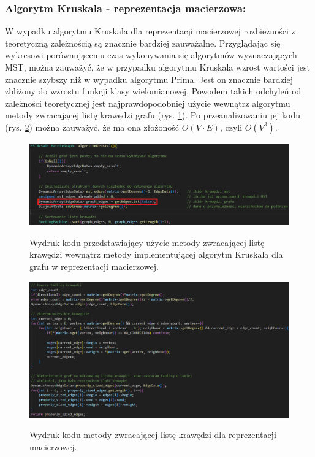 \documentclass[a4paper,12pt]{article}
\begin{document}
\subsubsection{Algorytm Kruskala - reprezentacja macierzowa:}
W wypadku algorytmu Kruskala dla reprezentacji macierzowej rozbieżności z teoretyczną zależnością są znacznie bardziej zauważalne. Przyglądając się wykresowi porównującemu czas wykonywania się algorytmów wyznaczających MST, można zauważyć, że w przypadku algorytmu Kruskala wzrost wartości jest znacznie szybszy niż w wypadku algorytmu Prima. Jest on znacznie bardziej zbliżony do wzrostu funkcji klasy wielomianowej. Powodem takich odchyleń od zależności teoretycznej jest najprawdopodobniej użycie wewnątrz algorytmu metody zwracającej listę krawędzi grafu (rys. \ref{fig.kruskal-macierz-wyjasnienie-1}). Po przeanalizowaniu jej kodu (rys. \ref{fig.kruskal-macierz-wyjasnienie-2}) można zauważyć, że ma ona złożoność $O(V \cdot E)$, czyli $O(V^3)$.
\begin{figure}[H]
	\centering
	\caption{\centering Wydruk kodu przedstawiający użycie metody zwracającej listę krawędzi wewnątrz metody implementującej algorytm Kruskala dla grafu w reprezentacji macierzowej.}
	\includegraphics[width=14cm]{fig7.png}
	\label{fig.kruskal-macierz-wyjasnienie-1}
\end{figure}

\begin{figure}[H]
	\centering
	\caption{\centering Wydruk kodu metody zwracającej listę krawędzi dla reprezentacji macierzowej.}
	\includegraphics[width=14cm]{fig8.png}
	\label{fig.kruskal-macierz-wyjasnienie-2}
\end{figure}
\end{document}
